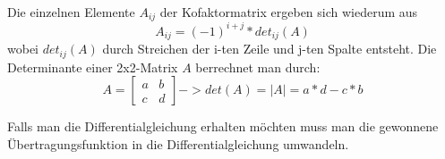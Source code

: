 Die einzelnen Elemente $A_{ij}$ der Kofaktormatrix ergeben sich wiederum aus
\begin{equation*}
	A_{ij} = (-1)^{i+j}*det_{ij}(A)
\end{equation*}
wobei $det_{ij}(A)$ durch Streichen der i-ten Zeile und j-ten Spalte entsteht.
Die Determinante einer 2x2-Matrix $A$ berrechnet man durch:
\begin{equation*}
	A = \begin{bmatrix}a&b\\c&d\end{bmatrix} -> det(A) = |A| = a*d - c*b
\end{equation*}

Falls man die Differentialgleichung erhalten möchten muss man die gewonnene Übertragungsfunktion in die Differentialgleichung umwandeln.
